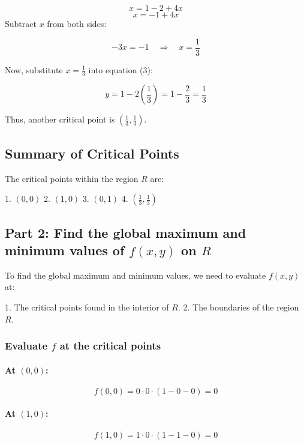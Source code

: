 \documentclass[11pt]{article}
\begin{document}
\[
x = 1 - 2 + 4x
\]
\[
x = -1 + 4x
\]
Subtract \( x \) from both sides:

\[
-3x = -1 \quad \Rightarrow \quad x = \frac{1}{3}
\]

Now, substitute \( x = \frac{1}{3} \) into equation (3):

\[
y = 1 - 2\left( \frac{1}{3} \right) = 1 - \frac{2}{3} = \frac{1}{3}
\]

Thus, another critical point is \( \left( \frac{1}{3}, \frac{1}{3} \right) \).

\newpage

\subsection{Summary of Critical Points}

The critical points within the region \( R \) are:

1. \( (0, 0) \)
2. \( (1, 0) \)
3. \( (0, 1) \)
4. \( \left( \frac{1}{3}, \frac{1}{3} \right) \)

\newpage

\subsection{Part 2: Find the global maximum and minimum values of \( f(x, y) \) on \( R \)}

To find the global maximum and minimum values, we need to evaluate \( f(x, y) \) at:

1. The critical points found in the interior of \( R \).
2. The boundaries of the region \( R \).

\newpage

\subsubsection{Evaluate \( f \) at the critical points}

\paragraph{At \( (0, 0) \):}

\[
f(0, 0) = 0 \cdot 0 \cdot (1 - 0 - 0) = 0
\]

\paragraph{At \( (1, 0) \):}

\[
f(1, 0) = 1 \cdot 0 \cdot (1 - 1 - 0) = 0
\]
\end{document}
